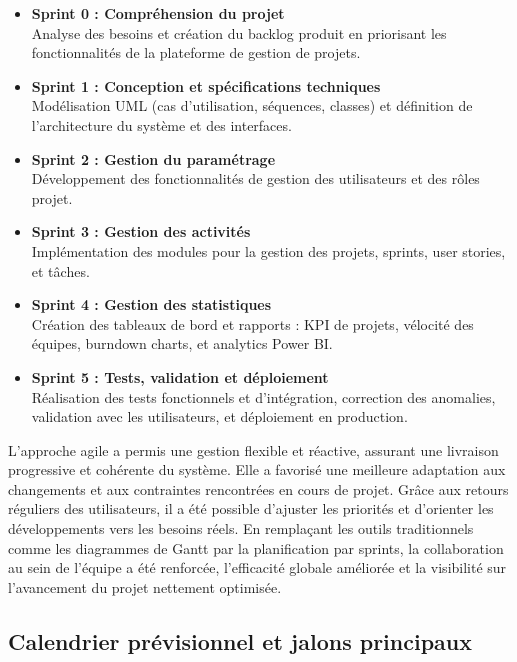 \begin{itemize}
    \item \textbf{Sprint 0 : Compréhension du projet} \\
    Analyse des besoins et création du backlog produit en priorisant les fonctionnalités de la plateforme de gestion de projets.
    \item \textbf{Sprint 1 : Conception et spécifications techniques} \\
    Modélisation UML (cas d'utilisation, séquences, classes) et définition de l'architecture du système et des interfaces.
    \item \textbf{Sprint 2 : Gestion du paramétrage} \\
    Développement des fonctionnalités de gestion des utilisateurs et des rôles projet.
    \item \textbf{Sprint 3 : Gestion des activités} \\
    Implémentation des modules pour la gestion des projets, sprints, user stories, et tâches.
    \item \textbf{Sprint 4 : Gestion des statistiques} \\
    Création des tableaux de bord et rapports : KPI de projets, vélocité des équipes, burndown charts, et analytics Power BI.
    \item \textbf{Sprint 5 : Tests, validation et déploiement} \\
    Réalisation des tests fonctionnels et d'intégration, correction des anomalies, validation avec les utilisateurs, et déploiement en production.
\end{itemize}

L'approche agile a permis une gestion flexible et réactive, assurant une livraison progressive et cohérente du système. Elle a favorisé une meilleure adaptation aux changements et aux contraintes rencontrées en cours de projet. Grâce aux retours réguliers des utilisateurs, il a été possible d'ajuster les priorités et d'orienter les développements vers les besoins réels. En remplaçant les outils traditionnels comme les diagrammes de Gantt par la planification par sprints, la collaboration au sein de l'équipe a été renforcée, l'efficacité globale améliorée et la visibilité sur l'avancement du projet nettement optimisée.
\subsection{Calendrier prévisionnel et jalons principaux}


